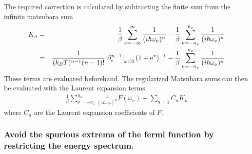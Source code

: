 \documentclass[11pt,a4paper]{report}
\begin{document}
The required correction is calculated by subtracting the finite sum
from the infinite matsubara sum
\begin{eqnarray}
K_n&=&\frac{1}{\beta}\sum_{\nu=-\infty}^{\infty} \frac{1}{(i\hbar\omega_\nu)^n} 
-\frac{1}{\beta}\sum_{\nu=-n_x}^{n_x} \frac{1}{(i\hbar\omega_\nu)^n} 
\nonumber\\
&=&\frac{1}{(k_BT)^{n-1}(n-1)!}
\left.\partial_\epsilon^{n-1}\right|_{x=0}(1+\mathrm{e}^{x})^{-1}
-\frac{1}{\beta}\sum_{\nu=-n_x}^{n_x} \frac{1}{(i\hbar\omega_\nu)^n} 
\end{eqnarray}
These terms are evaluated beforehand. The regularized Matsubara sums
can then be evaluated with the Laurent expansion terms
\begin{eqnarray}
\frac{1}{\beta}\sum_{\nu=-n_x}^{n_x} \frac{1}{(i\hbar\omega_\nu)^n} F(\omega_\nu)
+\sum_{n=1} C_n K_n
\end{eqnarray}
where $C_n$ are the Laurent expansion coefficients of $F$.




\subsubsection{Avoid the spurious extrema of the fermi function by 
restricting the energy spectrum.}
\end{document}
